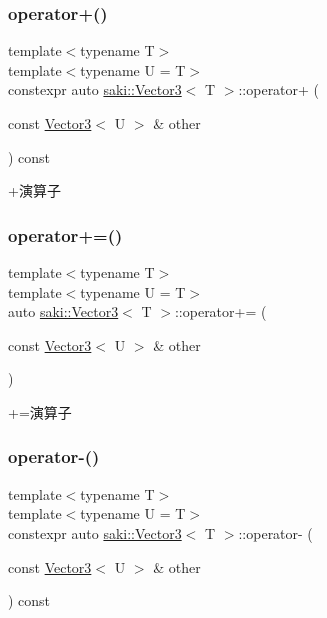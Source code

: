 \subsubsection{\texorpdfstring{operator+()}{operator+()}}
{\footnotesize\ttfamily template$<$typename T$>$ \\
template$<$typename U  = T$>$ \\
constexpr auto \mbox{\hyperlink{classsaki_1_1_vector3}{saki\+::\+Vector3}}$<$ T $>$\+::operator+ (\begin{DoxyParamCaption}\item[{const \mbox{\hyperlink{classsaki_1_1_vector3}{Vector3}}$<$ U $>$ \&}]{other }\end{DoxyParamCaption}) const\hspace{0.3cm}{\ttfamily [inline]}}



+演算子 

\mbox{\label{classsaki_1_1_vector3_a99b24e43486d76b449b23239c80f70d7}} 
\subsubsection{\texorpdfstring{operator+=()}{operator+=()}}
{\footnotesize\ttfamily template$<$typename T$>$ \\
template$<$typename U  = T$>$ \\
auto \mbox{\hyperlink{classsaki_1_1_vector3}{saki\+::\+Vector3}}$<$ T $>$\+::operator+= (\begin{DoxyParamCaption}\item[{const \mbox{\hyperlink{classsaki_1_1_vector3}{Vector3}}$<$ U $>$ \&}]{other }\end{DoxyParamCaption})\hspace{0.3cm}{\ttfamily [inline]}}



+=演算子 

\mbox{\label{classsaki_1_1_vector3_a9ff13b4e1114404b1b5391cd6aecb7c7}} 
\subsubsection{\texorpdfstring{operator-\/()}{operator-()}}
{\footnotesize\ttfamily template$<$typename T$>$ \\
template$<$typename U  = T$>$ \\
constexpr auto \mbox{\hyperlink{classsaki_1_1_vector3}{saki\+::\+Vector3}}$<$ T $>$\+::operator-\/ (\begin{DoxyParamCaption}\item[{const \mbox{\hyperlink{classsaki_1_1_vector3}{Vector3}}$<$ U $>$ \&}]{other }\end{DoxyParamCaption}) const\hspace{0.3cm}{\ttfamily [inline]}}



